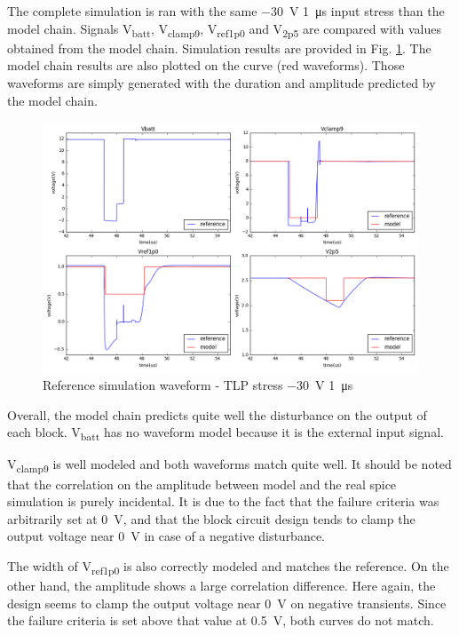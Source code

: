 The complete simulation is ran with the same \SI{-30}{\volt} \SI{1}{\micro\second} input stress than the model chain.
Signals V\textsubscript{batt}, V\textsubscript{clamp9}, V\textsubscript{ref1p0} and V\textsubscript{2p5} are compared with values obtained from the model chain.
Simulation results are provided in Fig. \ref{fig:reference_simu}.
The model chain results are also plotted on the curve (red waveforms).
Those waveforms are simply generated with the duration and amplitude predicted by the model chain.

\begin{figure}[!h]
  \centering
  \includegraphics[width=\textwidth]{src/4/figures/total_simulation_30V_1u.png}
  \caption{Reference simulation waveform - TLP stress \SI{-30}{\volt} \SI{1}{\micro\second}}
  \label{fig:reference_simu}
\end{figure}

Overall, the model chain predicts quite well the disturbance on the output of each block.
V\textsubscript{batt} has no waveform model because it is the external input signal.

V\textsubscript{clamp9} is well modeled and both waveforms match quite well.
It should be noted that the correlation on the amplitude between model and the real \gls{spice} simulation is purely incidental.
It is due to the fact that the failure criteria was arbitrarily set at \SI{0}{\volt}, and that the block circuit design tends to clamp the output voltage near \SI{0}{\volt} in case of a negative disturbance.

The width of V\textsubscript{ref1p0} is also correctly modeled and matches the reference.
On the other hand, the amplitude shows a large correlation difference.
Here again, the design seems to clamp the output voltage near \SI{0}{\volt} on negative transients.
Since the failure criteria is set above that value at \SI{0.5}{\volt}, both curves do not match.

